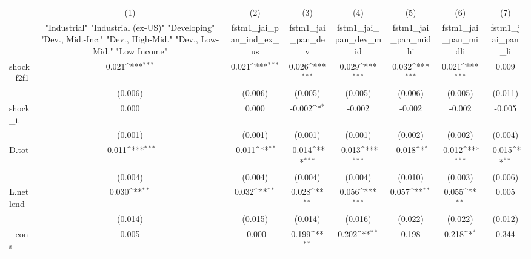 {
\def\sym#1{\ifmmode^{#1}\else\(^{#1}\)\fi}
\begin{tabular}{l*{7}{c}}
\toprule
            &\multicolumn{1}{c}{(1)}&\multicolumn{1}{c}{(2)}&\multicolumn{1}{c}{(3)}&\multicolumn{1}{c}{(4)}&\multicolumn{1}{c}{(5)}&\multicolumn{1}{c}{(6)}&\multicolumn{1}{c}{(7)}\\
            &\multicolumn{1}{c}{ "Industrial" "Industrial (ex-US)" "Developing" "Dev., Mid.-Inc." "Dev., High-Mid."  "Dev., Low-Mid." "Low Income" }&\multicolumn{1}{c}{fstm1\_jai\_pan\_ind\_ex\_us}&\multicolumn{1}{c}{fstm1\_jai\_pan\_dev}&\multicolumn{1}{c}{fstm1\_jai\_pan\_dev\_mid}&\multicolumn{1}{c}{fstm1\_jai\_pan\_midhi}&\multicolumn{1}{c}{fstm1\_jai\_pan\_midli}&\multicolumn{1}{c}{fstm1\_jai\_pan\_li}\\
\midrule
shock\_f2f1  &       0.021\sym{***}&       0.021\sym{***}&       0.026\sym{***}&       0.029\sym{***}&       0.032\sym{***}&       0.021\sym{***}&       0.009         \\
            &     (0.006)         &     (0.006)         &     (0.005)         &     (0.005)         &     (0.006)         &     (0.005)         &     (0.011)         \\
\addlinespace
shock\_t     &       0.000         &       0.000         &      -0.002\sym{*}  &      -0.002         &      -0.002         &      -0.002         &      -0.005         \\
            &     (0.001)         &     (0.001)         &     (0.001)         &     (0.001)         &     (0.002)         &     (0.002)         &     (0.004)         \\
\addlinespace
D.tot       &      -0.011\sym{***}&      -0.011\sym{**} &      -0.014\sym{***}&      -0.013\sym{***}&      -0.018\sym{*}  &      -0.012\sym{***}&      -0.015\sym{**} \\
            &     (0.004)         &     (0.004)         &     (0.004)         &     (0.004)         &     (0.010)         &     (0.003)         &     (0.006)         \\
\addlinespace
L.netlend   &       0.030\sym{**} &       0.032\sym{**} &       0.028\sym{**} &       0.056\sym{***}&       0.057\sym{**} &       0.055\sym{**} &       0.005         \\
            &     (0.014)         &     (0.015)         &     (0.014)         &     (0.016)         &     (0.022)         &     (0.022)         &     (0.012)         \\
\addlinespace
\_cons      &       0.005         &      -0.000         &       0.199\sym{**} &       0.202\sym{**} &       0.198         &       0.218\sym{*}  &       0.344         \\

\end{tabular}}
